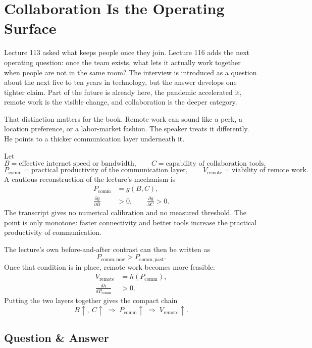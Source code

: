 \documentclass[11pt,oneside]{book}
\begin{document}
\section{Collaboration Is the Operating Surface}

Lecture 113 asked what keeps people once they join. Lecture 116 adds the next operating question: once the team exists, what lets it actually work together when people are not in the same room? The interview is introduced as a question about the next five to ten years in technology, but the answer develops one tighter claim. Part of the future is already here, the pandemic accelerated it, remote work is the visible change, and collaboration is the deeper category.

That distinction matters for the book. Remote work can sound like a perk, a location preference, or a labor-market fashion. The speaker treats it differently. He points to a thicker communication layer underneath it.

Let
\[
B=\text{effective internet speed or bandwidth},
\qquad
C=\text{capability of collaboration tools},
\]
\[
P_{\mathrm{comm}}=\text{practical productivity of the communication layer},
\qquad
V_{\mathrm{remote}}=\text{viability of remote work}.
\]
A cautious reconstruction of the lecture's mechanism is
\begin{align}
P_{\mathrm{comm}} &= g(B,C),\\
\frac{\partial g}{\partial B} &> 0,
\qquad
\frac{\partial g}{\partial C} > 0.
\end{align}
The transcript gives no numerical calibration and no measured threshold. The point is only monotone: faster connectivity and better tools increase the practical productivity of communication.

The lecture's own before-and-after contrast can then be written as
\[
P_{\mathrm{comm},\mathrm{now}} > P_{\mathrm{comm},\mathrm{past}}.
\]
Once that condition is in place, remote work becomes more feasible:
\begin{align}
V_{\mathrm{remote}} &= h(P_{\mathrm{comm}}),\\
\frac{dh}{dP_{\mathrm{comm}}} &> 0.
\end{align}
Putting the two layers together gives the compact chain
\[
B\uparrow,\ C\uparrow
\;\Longrightarrow\;
P_{\mathrm{comm}}\uparrow
\;\Longrightarrow\;
V_{\mathrm{remote}}\uparrow.
\]

\subsection{Question \& Answer}
\end{document}
